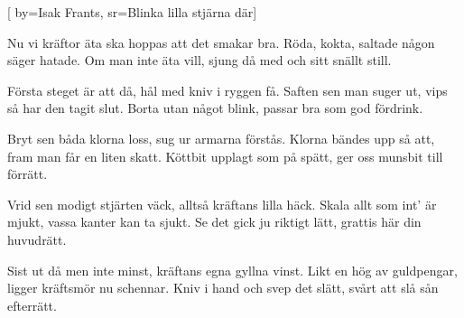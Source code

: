 [ 		
	by={Isak Frants},		
	sr={Blinka lilla stjärna där}]										

	
\beginverse*						
Nu vi kräftor äta ska
hoppas att det smakar bra.
Röda, kokta, saltade
någon säger hatade.
Om man inte äta vill,
sjung då med och sitt snällt still. 
\endverse						

\beginverse				
Första steget är att då,
hål med kniv i ryggen få.
Saften sen man suger ut,
vips så har den tagit slut.
Borta utan något blink,
passar bra som god fördrink.
\endverse				

\beginverse				
Bryt sen båda klorna loss,
sug ur armarna förstås.
Klorna bändes upp så att, 
fram man får en liten skatt.
Köttbit upplagt som på spätt,
ger oss munsbit till förrätt.
\endverse				

\beginverse				
Vrid sen modigt stjärten väck,
alltså kräftans lilla häck. 
Skala allt som int' är mjukt,
vassa kanter kan ta sjukt.
Se det gick ju riktigt lätt,
grattis här din huvudrätt.
\endverse				

\beginverse				
Sist ut då men inte minst,
kräftans egna gyllna vinst.
Likt en hög av guldpengar,
ligger kräftsmör nu schennar. 
Kniv i hand och svep det slätt,
svårt att slå sån efterrätt.
\endverse			

	
\endsong	
